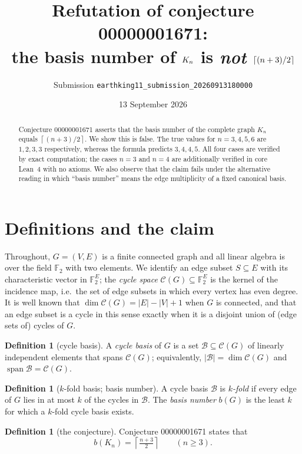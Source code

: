 \documentclass[11pt]{article}
\title{Refutation of conjecture 00000001671:\\
the basis number of $\Kn$ is \emph{not} $\ceil{(n+3)/2}$}
\author{Submission \texttt{earthking11\_submission\_20260913180000}}
\date{13 September 2026}
\theoremstyle{definition}
\newtheorem{definition}[theorem]{Definition}
\theoremstyle{remark}
\newcommand{\F}{\mathbb{F}}
\newcommand{\Kn}{K_n}
\newcommand{\ceil}[1]{\left\lceil #1 \right\rceil}
\begin{document}
\maketitle

\begin{abstract}
Conjecture 00000001671 asserts that the basis number of the complete graph
$\Kn$ equals $\ceil{(n+3)/2}$. We show this is false. The true values for
$n=3,4,5,6$ are $1,2,3,3$ respectively, whereas the formula predicts
$3,4,4,5$. All four cases are verified by exact computation; the cases $n=3$
and $n=4$ are additionally verified in core Lean~4 with no axioms. We also
observe that the claim fails under the alternative reading in which ``basis
number'' means the edge multiplicity of a fixed canonical basis.
\end{abstract}

\section{Definitions and the claim}

Throughout, $G=(V,E)$ is a finite connected graph and all linear algebra is
over the field $\F_2$ with two elements. We identify an edge subset $S\subseteq
E$ with its characteristic vector in $\F_2^{E}$; the \emph{cycle space}
$\mathcal{C}(G)\subseteq \F_2^{E}$ is the kernel of the incidence map, i.e.\
the set of edge subsets in which every vertex has even degree. It is
well known that $\dim \mathcal{C}(G) = |E|-|V|+1$ when $G$ is connected, and
that an edge subset is a cycle in this sense exactly when it is a disjoint
union of (edge sets of) cycles of $G$.

\begin{definition}[cycle basis]\label{def:cb}
A \emph{cycle basis} of $G$ is a set $\mathcal{B}\subseteq \mathcal{C}(G)$ of
linearly independent elements that spans $\mathcal{C}(G)$; equivalently,
$|\mathcal{B}| = \dim \mathcal{C}(G)$ and $\operatorname{span}\mathcal{B} =
\mathcal{C}(G)$.
\end{definition}

\begin{definition}[$k$-fold basis; basis number]\label{def:basis-number}
A cycle basis $\mathcal{B}$ is \emph{$k$-fold} if every edge of $G$ lies in at
most $k$ of the cycles in $\mathcal{B}$. The \emph{basis number} $b(G)$ is the
least $k$ for which a $k$-fold cycle basis exists.
\end{definition}

\begin{definition}[the conjecture]\label{def:conj}
Conjecture 00000001671 states that
\begin{equation}\label{eq:claim}
  b(\Kn) = \ceil{\tfrac{n+3}{2}} \qquad (n\ge 3).
\end{equation}
\end{definition}
\end{document}
